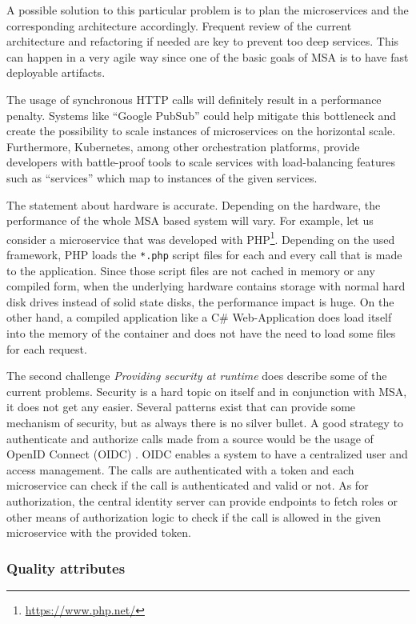 A possible solution to this particular problem is to plan
the microservices and the corresponding architecture accordingly.
Frequent review of the current architecture and refactoring \cite{zio:ARforCloud}
if needed are key to prevent too deep services. This can happen
in a very agile way since one of the basic goals of MSA is
to have fast deployable artifacts.

The usage of synchronous HTTP calls will definitely result
in a performance penalty. Systems like ``Google PubSub'' could help
mitigate this bottleneck and create the possibility to scale
instances of microservices on the horizontal scale.
Furthermore, Kubernetes, among other orchestration platforms, provide developers with
battle-proof tools to scale services with load-balancing features
such as ``services'' which map to instances of the given services.

The statement about hardware is accurate. Depending on the hardware,
the performance of the whole MSA based system will vary. For example,
let us consider a microservice that was developed with
PHP\footnote{\url{https://www.php.net/}}. Depending on the used framework,
PHP loads the \texttt{*.php} script files for each and every call that
is made to the application. Since those script files are not cached
in memory or any compiled form, when the underlying hardware contains
storage with normal hard disk drives instead of solid state disks,
the performance impact is huge. On the other hand, a compiled application
like a C\# Web-Application does load itself into the memory of the
container and does not have the need to load some files for each request.

The second challenge \textit{Providing security at runtime} does
describe some of the current problems. Security is a hard topic
on itself and in conjunction with MSA, it does not get any easier.
Several patterns exist that can provide some mechanism of security,
but as always there is no silver bullet. A good strategy to
authenticate and authorize calls made from a source would be the usage
of OpenID Connect (OIDC) \cite{Siriwardena:OIDC}. OIDC enables
a system to have a centralized user and access management. The
calls are authenticated with a token and each microservice can check
if the call is authenticated and valid or not. As for authorization,
the central identity server can provide endpoints to fetch roles
or other means of authorization logic to check if the call is allowed
in the given microservice with the provided token.

\subsubsection{Quality attributes}

